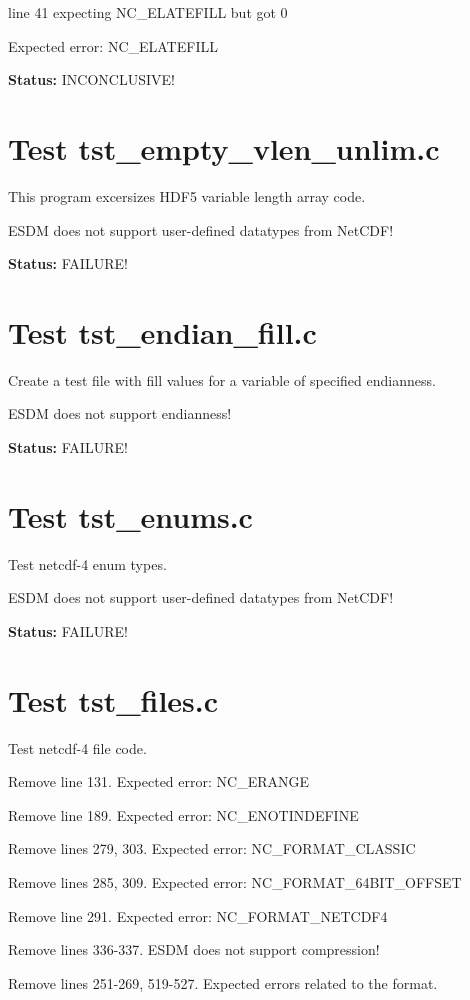 line 41 expecting NC\_ELATEFILL but got 0

Expected error: NC\_ELATEFILL

{\bf \large Status: } INCONCLUSIVE!

\section{Test tst\_empty\_vlen\_unlim.c}

This program excersizes HDF5 variable length array code.

ESDM does not support user-defined datatypes from NetCDF!

{\bf \large Status: } FAILURE!

\section{Test tst\_endian\_fill.c}

Create a test file with fill values for a variable of specified endianness.

ESDM does not support endianness!

{\bf \large Status: } FAILURE!

\section{Test tst\_enums.c}

Test netcdf-4 enum types.

ESDM does not support user-defined datatypes from NetCDF!

{\bf \large Status: } FAILURE!

\section{Test tst\_files.c}

Test netcdf-4 file code.

Remove line 131. Expected error: NC\_ERANGE

Remove line 189. Expected error: NC\_ENOTINDEFINE

Remove lines 279, 303. Expected error: NC\_FORMAT\_CLASSIC

Remove lines 285, 309. Expected error: NC\_FORMAT\_64BIT\_OFFSET

Remove line 291. Expected error: NC\_FORMAT\_NETCDF4

Remove lines 336-337. ESDM does not support compression!

Remove lines 251-269, 519-527. Expected errors related to the format.

